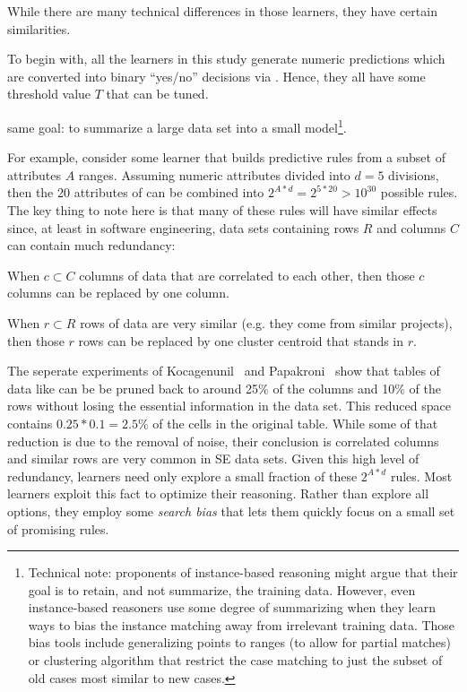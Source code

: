 While there are many technical
differences
in those learners, they have certain similarities.

To begin with, all the learners in this study generate numeric predictions which are converted
into binary ``yes/no'' decisions via . Hence, they all have some threshold  value $T$ 
that can be tuned.


same goal: to summarize a large data set into a small model\footnote{Technical note: proponents of instance-based reasoning might argue that
their goal is to retain, and not summarize, the training data.
However, 
even instance-based reasoners use some degree of summarizing when they learn
ways to bias the instance matching away from irrelevant training data.
Those bias tools include  generalizing points to ranges (to allow for partial matches)
or  clustering algorithm that restrict the case matching
to just the subset of old cases most similar  to new  cases.}. 

For example,
consider some learner that
builds predictive rules from a subset of  attributes $A$ ranges. Assuming numeric attributes
divided into $d=5$ divisions, then the 20 attributes of  can be combined into 
$2^{A*d} = 2^{5*20} > 10^{30}$
possible rules. The key thing to note here is that many of these rules will have similar effects
since, at least in software engineering, data sets containing rows $R$ and columns $C$ can contain much redundancy:
\bi
\item When $c \subset C$ columns of data that are correlated to each other, then those
$c$ columns can be replaced by one column.
\item When $r \subset R$ rows of data are very similar (e.g. they come from similar projects), 
then those $r$ rows can be replaced
by one cluster centroid that stands in $r$.
\item
The seperate experiments of
Kocagenunil~\cite{me13a} and Papakroni~\cite{papa13}  show that  tables  of data
like  can be be pruned back to around
25\% of the columns and 10\% of the rows without losing the essential information in the data set.
This reduced space contains $0.25*0.1 = 2.5\%$ of the cells in the original table.
While some of that reduction is due to the removal of noise, their conclusion is correlated
columns and similar rows are very common in SE data sets.
\ei
Given this high level of redundancy, learners need only explore a small fraction of these $2^{A*d}$ rules.
Most learners exploit this fact to optimize their reasoning. Rather than explore all options,
they employ some {\em search bias} that lets them quickly focus on a small set of promising rules.

